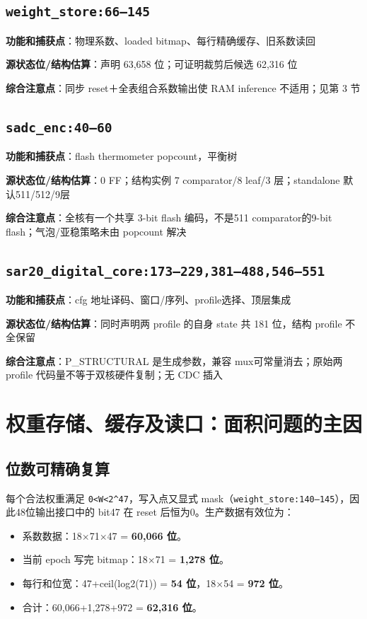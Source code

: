 \documentclass[UTF8,fontset=fandol,10pt,a4paper,openany]{ctexrep}
\newcommand{\code}[1]{\nolinkurl{#1}}
\begin{document}
\subsection*{\code{weight_store:66–145}}
\noindent\textbf{功能和捕获点}：物理系数、loaded bitmap、每行精确缓存、旧系数读回\par
\noindent\textbf{源状态位/结构估算}：声明 63,658 位；可证明裁剪后候选 62,316 位\par
\noindent\textbf{综合注意点}：同步 reset＋全表组合系数输出使 RAM inference 不适用；见第 3 节\par
\subsection*{\code{sadc_enc:40–60}}
\noindent\textbf{功能和捕获点}：flash thermometer popcount，平衡树\par
\noindent\textbf{源状态位/结构估算}：0 FF；结构实例 7 comparator/8 leaf/3 层；standalone 默认511/512/9层\par
\noindent\textbf{综合注意点}：全核有一个共享 3-bit flash 编码，不是511 comparator的9-bit flash；气泡/亚稳策略未由 popcount 解决\par
\subsection*{\code{sar20_digital_core:173–229,381–488,546–551}}
\noindent\textbf{功能和捕获点}：cfg 地址译码、窗口/序列、profile选择、顶层集成\par
\noindent\textbf{源状态位/结构估算}：同时声明两 profile 的自身 state 共 181 位，结构 profile 不全保留\par
\noindent\textbf{综合注意点}：P\_STRUCTURAL 是生成参数，兼容 mux可常量消去；原始两 profile 代码量不等于双核硬件复制；无 CDC 插入\par


\section{权重存储、缓存及读口：面积问题的主因}


\subsection{位数可精确复算}


每个合法权重满足 \code{0<W<2^47}，写入点又显式 mask（\code{weight_store:140–145}），因此48位输出接口中的 bit47 在 reset 后恒为0。生产数据有效位为：


\begin{itemize}
\item 系数数据：18\ensuremath{\times}71\ensuremath{\times}47 = \textbf{60,066 位}。
\item 当前 epoch 写完 bitmap：18\ensuremath{\times}71 = \textbf{1,278 位}。
\item 每行和位宽：47+ceil(log2(71)) = \textbf{54 位}，18\ensuremath{\times}54 = \textbf{972 位}。
\item 合计：60,066+1,278+972 = \textbf{62,316 位}。
\end{itemize}
\end{document}
